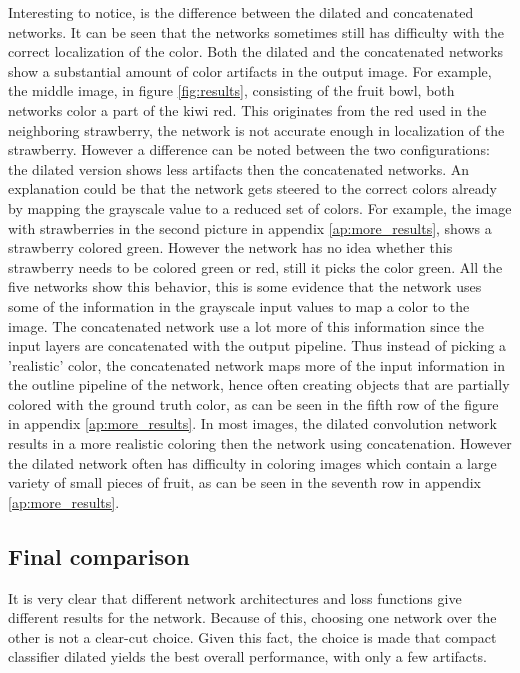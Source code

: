 Interesting to notice, is the difference between the dilated and concatenated networks. It can be seen that the networks sometimes still has difficulty with the correct localization of the color. Both the dilated and the concatenated networks show a substantial amount of color artifacts in the output image. For example, the middle image, in figure \ref{fig:results}, consisting of the fruit bowl, both networks color a part of the kiwi red. This originates from the red used in the neighboring strawberry, the network is not accurate enough in localization of the strawberry. However a difference can be noted between the two configurations: the dilated version shows less artifacts then the concatenated networks. An explanation could be that the network gets steered to the correct colors already by mapping the grayscale value to a reduced set of colors. For example, the image with strawberries in the second picture in appendix \ref{ap:more_results}, shows a strawberry colored green. However the network has no idea whether this strawberry needs to be colored green or red, still it picks the color green. All the five networks show this behavior, this is some evidence that the network uses some of the information in the grayscale input values to map a color to the image. The concatenated network use a lot more of this information since the input layers are concatenated with the output pipeline. Thus instead of picking a 'realistic' color, the concatenated network maps more of the input information in the outline pipeline of the network, hence often creating objects that are partially colored with the ground truth color, as can be seen in the fifth row of the figure in appendix \ref{ap:more_results}. In most images, the dilated convolution network results in a more realistic coloring then the network using concatenation. However the dilated network often has difficulty in coloring images which contain a large variety of small pieces of fruit, as can be seen in the seventh row in appendix \ref{ap:more_results}.

\subsection{Final comparison}
It is very clear that different network architectures and loss functions give different results for the network. Because of this, choosing one network over the other is not a clear-cut choice. Given this fact, the choice is made that compact classifier dilated yields the best overall performance, with only a few artifacts.








